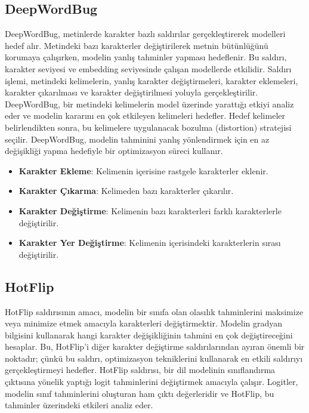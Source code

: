 \newpage

\subsection{DeepWordBug}

DeepWordBug, metinlerde karakter bazlı saldırılar gerçekleştirerek modelleri hedef alır. Metindeki bazı karakterler değiştirilerek metnin bütünlüğünü korumaya çalışırken, modelin yanlış tahminler yapması hedeflenir. Bu saldırı, karakter seviyesi ve embedding seviyesinde çalışan modellerde etkilidir. Saldırı işlemi, metindeki kelimelerin, yanlış karakter değiştirmeleri, karakter eklemeleri, karakter çıkarılması ve karakter değiştirilmesi yoluyla gerçekleştirilir. DeepWordBug, bir metindeki kelimelerin model üzerinde yarattığı etkiyi analiz eder ve modelin kararını en çok etkileyen kelimeleri hedefler. Hedef kelimeler belirlendikten sonra, bu kelimelere uygulanacak bozulma (distortion) stratejisi seçilir. DeepWordBug, modelin tahminini yanlış yönlendirmek için en az değişikliği yapma hedefiyle bir optimizasyon süreci kullanır.

\begin{itemize}
    \item \textbf{Karakter Ekleme}: Kelimenin içerisine rastgele karakterler eklenir.
    \item \textbf{Karakter Çıkarma}: Kelimeden bazı karakterler çıkarılır.
    \item \textbf{Karakter Değiştirme}: Kelimenin bazı karakterleri farklı karakterlerle değiştirilir.
    \item \textbf{Karakter Yer Değiştirme}: Kelimenin içerisindeki karakterlerin sırası değiştirilir.
\end{itemize}

\newpage

\subsection{HotFlip}

HotFlip saldırısının amacı, modelin bir sınıfa olan olasılık tahminlerini maksimize veya minimize etmek amacıyla karakterleri değiştirmektir. Modelin gradyan bilgisini kullanarak hangi karakter değişikliğinin tahmini en çok değiştireceğini hesaplar. Bu, HotFlip'i diğer karakter değiştirme saldırılarından ayıran önemli bir noktadır; çünkü bu saldırı, optimizasyon tekniklerini kullanarak en etkili saldırıyı gerçekleştirmeyi hedefler. HotFlip saldırısı, bir dil modelinin sınıflandırma çıktısına yönelik yaptığı logit tahminlerini değiştirmek amacıyla çalışır. Logitler, modelin sınıf tahminlerini oluşturan ham çıktı değerleridir ve HotFlip, bu tahminler üzerindeki etkileri analiz eder.

